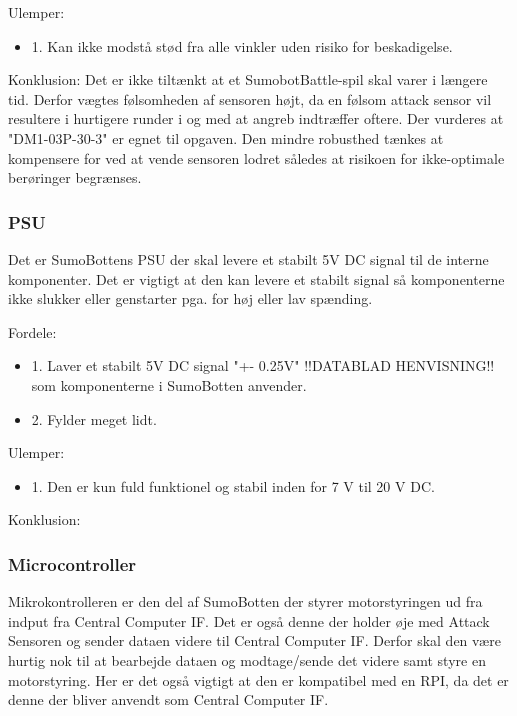 Ulemper: 
\begin{itemize}
\item 1. Kan ikke modstå stød fra alle vinkler uden risiko for beskadigelse.
\end{itemize}

Konklusion:
Det er ikke tiltænkt at et SumobotBattle-spil skal varer i længere tid. Derfor vægtes følsomheden af sensoren højt, da en følsom attack sensor vil resultere i hurtigere runder i og med at angreb indtræffer oftere. Der vurderes at "DM1-03P-30-3" er egnet til opgaven. Den mindre robusthed tænkes at kompensere for ved at vende sensoren lodret således at risikoen for ikke-optimale berøringer begrænses.

\subsubsection*{\textbf{PSU}}
Det er SumoBottens PSU der skal levere et stabilt 5V DC signal til de interne komponenter. Det er vigtigt at den kan levere et stabilt signal så komponenterne ikke slukker eller genstarter pga. for høj eller lav spænding.  

Fordele: 
\begin{itemize}
\item 1. Laver et stabilt 5V DC signal "+- 0.25V" !!DATABLAD HENVISNING!! som komponenterne i SumoBotten anvender.
\item 2. Fylder meget lidt. 
\end{itemize}

Ulemper: 
\begin{itemize}
\item 1. Den er kun fuld funktionel og stabil inden for 7 V til 20 V DC.
\end{itemize}

Konklusion:


\subsubsection*{\textbf{Microcontroller}}
Mikrokontrolleren er den del af SumoBotten der styrer motorstyringen ud fra indput fra Central Computer IF. Det er også denne der holder øje med Attack Sensoren og sender dataen videre til Central Computer IF. Derfor skal den være hurtig nok til at bearbejde dataen og modtage/sende det videre samt styre en motorstyring. Her er det også vigtigt at den er kompatibel med en RPI, da det er denne der bliver anvendt som Central Computer IF. 

